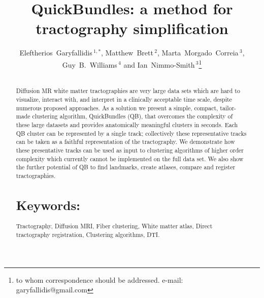 \documentclass{bioinfo}
\begin{document}

\title[QuickBundles]{QuickBundles: a method for tractography simplification}

\author[Garyfallidis, Brett, Correia, Williams and
Nimmo-Smith]{Eleftherios~Garyfallidis\,$^{1,*}$, Matthew~Brett\,$^{2}$,
  Marta~Morgado~Correia\,$^{3}$, Guy~B.~Williams\,$^{4}$ and
  Ian~Nimmo-Smith\,$^{3}$\footnote{to whom correspondence should be
    addressed. e-mail: garyfallidis@gmail.com}}

\address{\,$^{1}$University of Cambridge, Cambridge, UK\\
  \,$^{2}$University of California, Henry H. Wheeler, Jr. Brain Imaging Center, Berkeley, CA.\\
  \,$^{3}$MRC Cognition and Brain Sciences Unit, Cambridge, UK.\\
  \,$^{4}$Wolfson Brain Imaging Centre, University of Cambridge,
  Cambridge, UK.}


\history{}

\editor{}

\maketitle

\begin{abstract}

\section{}
Diffusion MR white matter tractographies are very large data sets which
are hard to visualize, interact with, and interpret in a clinically
acceptable time scale, despite numerous proposed approaches. As a
solution we present a simple, compact, tailor-made clustering algorithm,
QuickBundles (QB), that overcomes the complexity of these large datasets
and provides anatomically meaningful clusters in seconds. Each QB
cluster can be represented by a single track; collectively these
representative tracks can be taken as a faithful representation of the
tractography. We demonstrate how these presentative tracks can be used
as input to clustering algorithms of higher order complexity which
currently cannot be implemented on the full data set. We also show the
further potential of QB to find landmarks, create atlases, compare and
register tractographies.


\section{Keywords:} Tractography, Diffusion MRI, Fiber clustering, White
matter atlas, Direct tractography registration, Clustering algorithms,
DTI.

\end{abstract}
\end{document}
